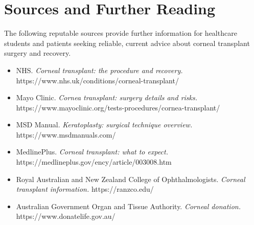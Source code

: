 \section*{Sources and Further Reading}
The following reputable sources provide further information for healthcare students and patients seeking reliable, current advice about corneal transplant surgery and recovery.

\begin{itemize}
    \item NHS. \textit{Corneal transplant: the procedure and recovery.} https://www.nhs.uk/conditions/corneal-transplant/
    \item Mayo Clinic. \textit{Cornea transplant: surgery details and risks.} https://www.mayoclinic.org/tests-procedures/cornea-transplant/
    \item MSD Manual. \textit{Keratoplasty: surgical technique overview.} https://www.msdmanuals.com/
    \item MedlinePlus. \textit{Corneal transplant: what to expect.} https://medlineplus.gov/ency/article/003008.htm
    \item Royal Australian and New Zealand College of Ophthalmologists. \textit{Corneal transplant information.} https://ranzco.edu/
    \item Australian Government Organ and Tissue Authority. \textit{Corneal donation.} https://www.donatelife.gov.au/
\end{itemize}
